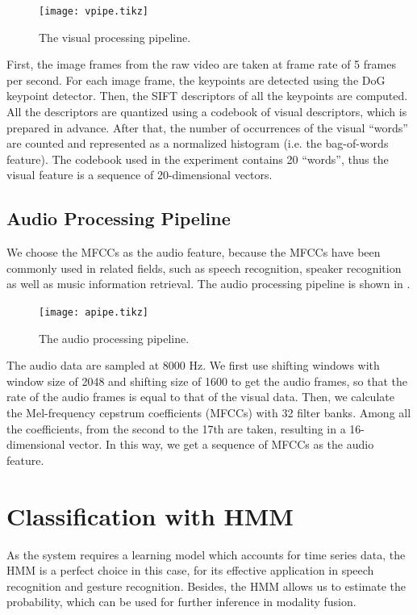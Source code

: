 \documentclass[letterpaper, 10 pt, conference]{ieeeconf}  %
\begin{document}
\begin{figure}[t]
  \centering
  \texttt{[image: vpipe.tikz]}
  \caption{The visual processing pipeline.}
  \label{fig:vpipe}
\end{figure}

First, the image frames from the raw video are taken at frame rate of 5 frames per second. For each image frame, the keypoints are detected using the DoG keypoint detector. Then, the SIFT descriptors of all the keypoints are computed. All the descriptors are quantized using a codebook of visual descriptors, which is prepared in advance. After that, the number of occurrences of the visual ``words'' are counted and represented as a normalized histogram (i.e. the bag-of-words feature). The codebook used in the experiment contains 20 ``words'', thus the visual feature is a sequence of 20-dimensional vectors.

\subsection{Audio Processing Pipeline}
We choose the MFCCs as the audio feature, because the MFCCs have been commonly used in related fields, such as speech recognition, speaker recognition as well as music information retrieval. The audio processing pipeline is shown in .

\begin{figure}[t]
  \footnotesize
  \centering
  \texttt{[image: apipe.tikz]}
  \caption{The audio processing pipeline.}
  \label{fig:apipe}
\end{figure}

The audio data are sampled at 8000 Hz. We first use shifting windows with window size of 2048 and shifting size of 1600 to get the audio frames, so that the rate of the audio frames is equal to that of the visual data. Then, we calculate the Mel-frequency cepstrum coefficients (MFCCs) with 32 filter banks. Among all the coefficients, from the second to the 17th are taken, resulting in a 16-dimensional vector. In this way, we get a sequence of MFCCs as the audio feature.

\section{Classification with HMM}
As the system requires a learning model which accounts for time series data, the HMM is a perfect choice in this case, for its effective application in speech recognition and gesture recognition. Besides, the HMM allows us to estimate the probability, which can be used for further inference in modality fusion.
\end{document}
